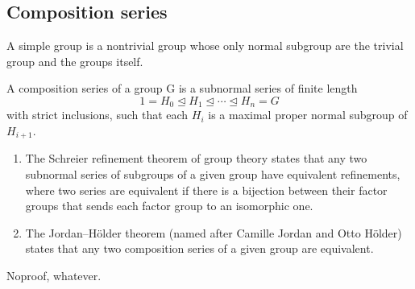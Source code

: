 \subsection{Composition series}
\begin{definition}
    A simple group is a nontrivial group whose only normal subgroup are the trivial group and the groups itself.
\end{definition}

\begin{definition}
    A composition series of a group G is a subnormal series of finite length\[1=H_{0}\unlhd H_{1}\unlhd \cdots \unlhd H_{n}=G\]
    with strict inclusions, such that each $H_i$ is a maximal proper normal subgroup of $H_{i+1}$.
\end{definition}
\begin{theorem}
    \begin{enumerate}
        \item The Schreier refinement theorem of group theory states that any two subnormal series of subgroups of a given group have equivalent refinements, where two series are equivalent if there is a bijection between their factor groups that sends each factor group to an isomorphic one.
        \item  The Jordan–Hölder theorem (named after Camille Jordan and Otto Hölder) states that any two composition series of a given group are equivalent.
    \end{enumerate}
\end{theorem}
\begin{remark}
    Noproof, whatever.
\end{remark}